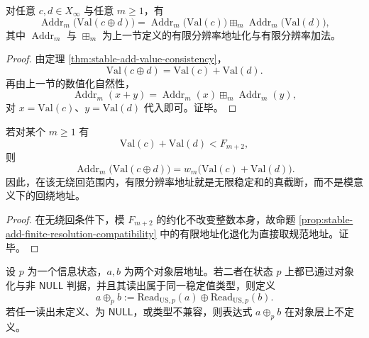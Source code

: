 \begin{proposition}[有限分辨率数值化与稳定加法的兼容性]\label{prop:stable-add-finite-resolution-compatibility}
对任意 \(c,d\in X_\infty\) 与任意 \(m\ge 1\)，有
\[
\operatorname{Addr}_m\!\bigl(\mathrm{Val}(c\oplus d)\bigr)
=
\operatorname{Addr}_m\!\bigl(\mathrm{Val}(c)\bigr)
\boxplus_m
\operatorname{Addr}_m\!\bigl(\mathrm{Val}(d)\bigr),
\]
其中 \(\operatorname{Addr}_m\) 与 \(\boxplus_m\) 为上一节定义的有限分辨率地址化与有限分辨率加法。
\end{proposition}
\begin{proof}
由定理 \ref{thm:stable-add-value-consistency}，
\[
\mathrm{Val}(c\oplus d)=\mathrm{Val}(c)+\mathrm{Val}(d).
\]
再由上一节的数值化自然性，
\[
\operatorname{Addr}_m(x+y)=\operatorname{Addr}_m(x)\boxplus_m \operatorname{Addr}_m(y),
\]
对 \(x=\mathrm{Val}(c)\)、\(y=\mathrm{Val}(d)\) 代入即可。证毕。
\end{proof}

\begin{corollary}[无绕回情形的截断一致性]
若对某个 \(m\ge 1\) 有
\[
\mathrm{Val}(c)+\mathrm{Val}(d)<F_{m+2},
\]
则
\[
\operatorname{Addr}_m\!\bigl(\mathrm{Val}(c\oplus d)\bigr)
=
w_m\!\bigl(\mathrm{Val}(c)+\mathrm{Val}(d)\bigr).
\]
因此，在该无绕回范围内，有限分辨率地址就是无限稳定和的真截断，而不是模意义下的回绕地址。
\end{corollary}
\begin{proof}
在无绕回条件下，模 \(F_{m+2}\) 的约化不改变整数本身，故命题 \ref{prop:stable-add-finite-resolution-compatibility} 中的有限地址化退化为直接取规范地址。证毕。
\end{proof}

\begin{definition}[对象层可定义的稳定加法]
设 \(p\) 为一个信息状态，\(a,b\) 为两个对象层地址。若二者在状态 \(p\) 上都已通过对象化与非 \(\mathsf{NULL}\) 判据，并且其读出属于同一稳定值类型，则定义
\[
a\oplus_p b
:=
\mathrm{Read}_{\mathrm{US},p}(a)\oplus \mathrm{Read}_{\mathrm{US},p}(b).
\]
若任一读出未定义、为 \(\mathsf{NULL}\)，或类型不兼容，则表达式 \(a\oplus_p b\) 在对象层上不定义。
\end{definition}


